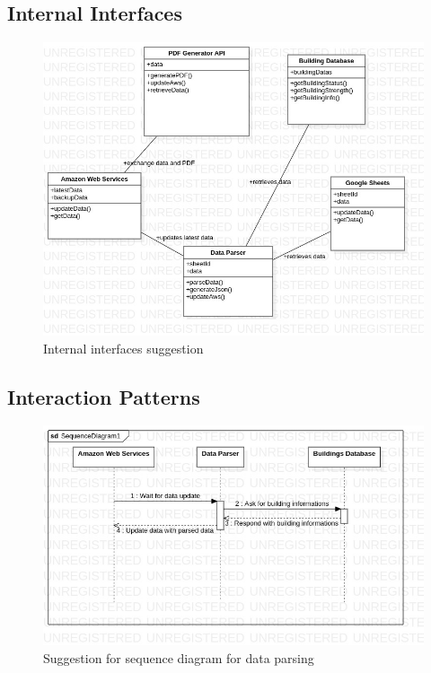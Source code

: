 \documentclass[12pt]{report}
\begin{document}
\subsection{Internal Interfaces}
\begin{figure}[H]
    \includegraphics[scale=0.6]{internal2.jpg}
    \centering
    \caption{Internal interfaces suggestion}
\end{figure}

\subsection{Interaction Patterns}
\begin{figure}[H]
    \includegraphics[scale=0.6]{seqsuggest}
    \centering
    \caption{Suggestion for sequence diagram for data parsing}
\end{figure}
\end{document}
